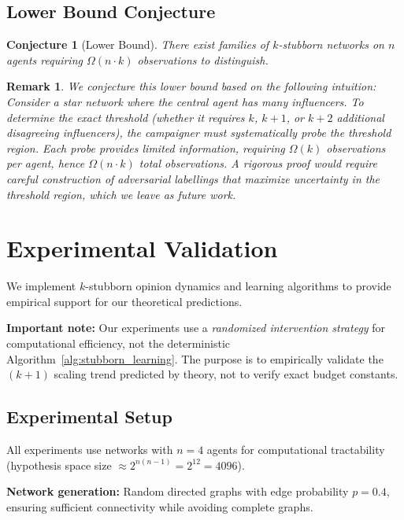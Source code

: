 \documentclass[conference]{IEEEtran}
\newtheorem{remark}{Remark}
\newtheorem{conjecture}{Conjecture}
\begin{document}
\subsection{Lower Bound Conjecture}

\begin{conjecture}[Lower Bound]
\label{conj:lower_bound}
There exist families of $k$-stubborn networks on $n$ agents requiring $\Omega(n \cdot k)$ observations to distinguish.
\end{conjecture}

\begin{remark}
We conjecture this lower bound based on the following intuition: Consider a star network where the central agent has many influencers. To determine the exact threshold (whether it requires $k$, $k+1$, or $k+2$ additional disagreeing influencers), the campaigner must systematically probe the threshold region. Each probe provides limited information, requiring $\Omega(k)$ observations per agent, hence $\Omega(n \cdot k)$ total observations. A rigorous proof would require careful construction of adversarial labellings that maximize uncertainty in the threshold region, which we leave as future work.
\end{remark}

\section{Experimental Validation}
\label{sec:experiments}

We implement $k$-stubborn opinion dynamics and learning algorithms to provide empirical support for our theoretical predictions. 

\textbf{Important note:} Our experiments use a \emph{randomized intervention strategy} for computational efficiency, not the deterministic Algorithm~\ref{alg:stubborn_learning}. The purpose is to empirically validate the $(k+1)$ scaling trend predicted by theory, not to verify exact budget constants.

\subsection{Experimental Setup}

All experiments use networks with $n=4$ agents for computational tractability (hypothesis space size $\approx 2^{n(n-1)} = 2^{12} = 4096$).

\textbf{Network generation:} Random directed graphs with edge probability $p=0.4$, ensuring sufficient connectivity while avoiding complete graphs.
\end{document}
